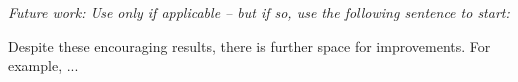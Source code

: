 \documentclass[letterpaper, 10 pt, conference]{ieeeconf}  %
\begin{document}
\emph{Future work: Use only if applicable -- but if so, use the
  following sentence to start:} 

Despite these encouraging results, there is further space for
improvements. For example, ...





\end{document}
